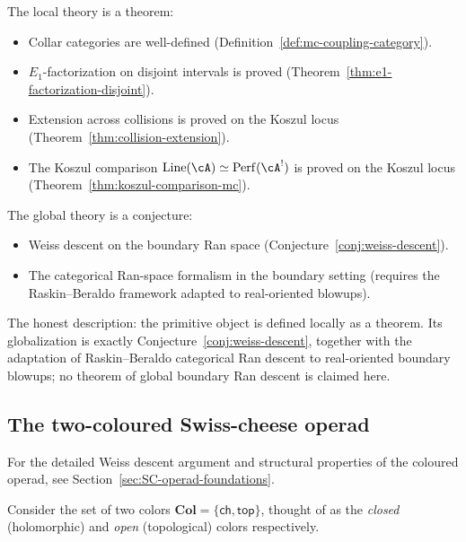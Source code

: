 \begin{remark}
\label{rem:local-vs-global-honest}
The local theory is a theorem:
\begin{itemize}[nosep]
\item Collar categories are well-defined
 (Definition~\ref{def:mc-coupling-category}).
\item $E_1$-factorization on disjoint intervals is proved
 (Theorem~\ref{thm:e1-factorization-disjoint}).
\item Extension across collisions is proved on the Koszul locus
 (Theorem~\ref{thm:collision-extension}).
\item The Koszul comparison $\operatorname{Line}(\cA)
 \simeq \Perf(\cA^!)$ is proved on the Koszul locus
 (Theorem~\ref{thm:koszul-comparison-mc}).
\end{itemize}
The global theory is a conjecture:
\begin{itemize}[nosep]
\item Weiss descent on the boundary Ran space
 (Conjecture~\ref{conj:weiss-descent}).
\item The categorical Ran-space formalism in the boundary setting
 (requires the Raskin--Beraldo framework adapted to
 real-oriented blowups).
\end{itemize}
The honest description: the primitive object is defined locally
as a theorem. Its globalization is exactly
Conjecture~\ref{conj:weiss-descent}, together with the adaptation of
Raskin--Beraldo categorical Ran descent to real-oriented boundary
blowups; no theorem of global boundary Ran descent is claimed here.
\end{remark}

\subsection{The two-coloured Swiss-cheese operad}
\label{subsec:SC-operad}

For the detailed Weiss descent argument and structural properties of
the coloured operad, see Section~\ref{sec:SC-operad-foundations}.

\begin{definition}[Colors]
\label{def:SC-colors}
Consider the set of two colors $\mathbf{Col}=\{\mathsf{ch},\mathsf{top}\}$, thought of as the
\emph{closed} (holomorphic) and \emph{open} (topological) colors respectively.
\end{definition}

